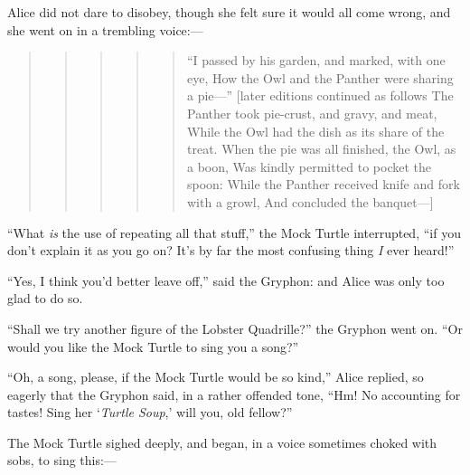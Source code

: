 \documentclass[11pt,openany,oneside]{book}
\begin{document}
Alice did not dare to disobey, though she felt sure it would all come wrong, and she went on in a trembling voice:— 

\begin{quote}
\begin{quote}
\begin{quote}
\begin{quote}
\begin{quote}
{\small “I passed by his garden, and marked, with one eye,}\newline
{\small  How the Owl and the Panther were sharing a pie—”}\newline
{\small  }\newline
{\small  [later editions continued as follows}\newline
{\small  The Panther took pie-crust, and gravy, and meat,}\newline
{\small  While the Owl had the dish as its share of the treat.}\newline
{\small  When the pie was all finished, the Owl, as a boon,}\newline
{\small  Was kindly permitted to pocket the spoon:}\newline
{\small  While the Panther received knife and fork with a growl,}\newline
{\small  And concluded the banquet—] }

\end{quote}
\end{quote}
\end{quote}
\end{quote}
\end{quote}
“What {\em is\/} the use of repeating all that stuff,” the Mock Turtle interrupted, “if you don’t explain it as you go on? It’s by far the most confusing thing {\em I\/} ever heard!” 

“Yes, I think you’d better leave off,” said the Gryphon: and Alice was only too glad to do so. 

“Shall we try another figure of the Lobster Quadrille?” the Gryphon went on. “Or would you like the Mock Turtle to sing you a song?” 

“Oh, a song, please, if the Mock Turtle would be so kind,” Alice replied, so eagerly that the Gryphon said, in a rather offended tone, “Hm! No accounting for tastes! Sing her ‘{\em Turtle Soup\/},’ will you, old fellow?” 

The Mock Turtle sighed deeply, and began, in a voice sometimes choked with sobs, to sing this:— 
\end{document}
